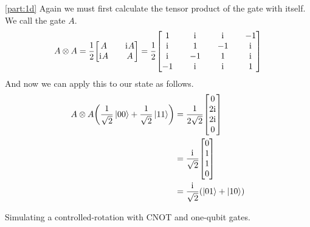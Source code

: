 \documentclass[boxes,pages]{homework}
\newcommand{\iu}{\mathrm{i}\mkern1mu}
\begin{document}
\begin{solution}
	\ref{part:1d}
	Again we must first calculate the tensor product of the gate with itself. We call the gate $A$.
	\begin{equation*}
		A\otimes A = \frac{1}{2}\mqty[A && \iu A \\ \iu A && A] = \frac{1}{2}\mqty[1 && \iu && \iu && -1 \\ \iu && 1 && -1 && \iu \\ \iu && -1 && 1 && \iu \\ -1 && \iu && \iu && 1]
	\end{equation*}
	And now we can apply this to our state as follows.
	\begin{align*}
		A\otimes A \qty(\frac{1}{\sqrt{2}}\ket{00} + \frac{1}{\sqrt{2}}\ket{11}) & = \frac{1}{2\sqrt{2}}\mqty[0                    \\ 2\iu \\ 2\iu \\ 0] \\
		                                                                         & = \frac{\iu}{\sqrt{2}}\mqty[0                   \\ 1 \\ 1 \\ 0] \\
		                                                                         & = \frac{\iu}{\sqrt{2}}\qty(\ket{01} + \ket{10})
	\end{align*}
\end{solution}

\begin{problem}
Simulating a controlled-rotation with CNOT and one-qubit gates.
\end{problem}
\end{document}
